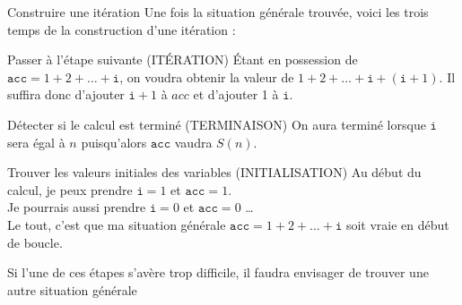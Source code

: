 \documentclass[10pt]{beamer}
\begin{document}

\begin{frame}{Construire une itération}
  Une fois la situation générale trouvée, voici les trois temps de la construction d'une itération :
  \begin{block}{Passer à l'étape suivante (\alert{ITÉRATION})}
    Étant en possession de $\mathtt{acc} = 1 + 2 + \dots + \mathtt{i}$, on voudra obtenir la valeur de $1 + 2 + \ldots + \mathtt{i} + (\mathtt{i}+1)$. Il suffira donc d'ajouter $\mathtt{i}+1$ à $acc$ et d'ajouter 1 à $\mathtt{i}$.    
  \end{block}
  \begin{block}{Détecter si le calcul est terminé (\alert{TERMINAISON})}
    On aura terminé lorsque $\mathtt{i}$ sera égal à $n$ puisqu'alors $\mathtt{acc}$ vaudra $S(n)$.
  \end{block}

  \begin{block}{Trouver les valeurs initiales des variables (\alert{INITIALISATION})}
    Au début du calcul, je peux prendre $\mathtt{i} = 1$ et $\mathtt{acc} =1$. \\
    Je pourrais aussi prendre $\mathtt{i} = 0$ et $\mathtt{acc} = 0$ \dots \\
    Le tout, c'est que ma situation générale $\mathtt{acc} = 1 + 2 + \ldots + \mathtt{i}$ soit vraie en début de boucle.
  \end{block}
  Si l'une de ces étapes s'avère trop difficile, il faudra envisager de trouver une autre situation générale
\end{frame}
\def\circledarrow#1#2#3{ %
\draw[#1,->] (#2) +(80:#3) arc(80:-260:#3);
}
\end{document}
